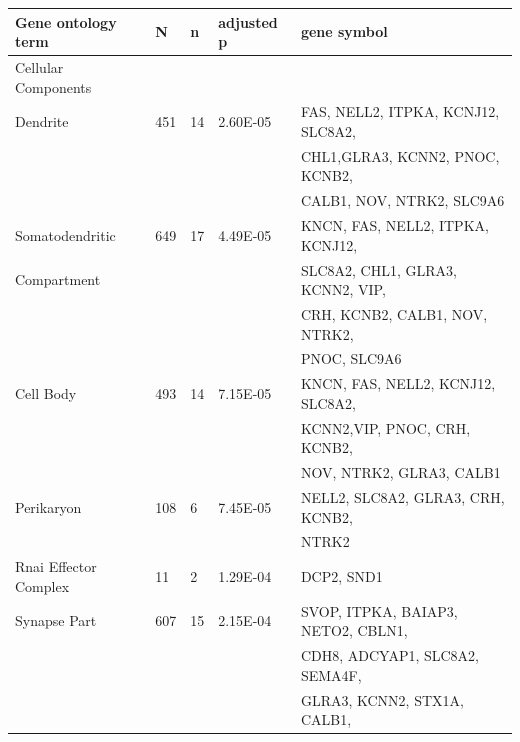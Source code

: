 \begin{refsection}
\begin{table}[H]
\small
{}\selectfont
{} \label{table3S4} 
\centering
\begin{tabular}{@{}lllll@{}}
\hline
Gene ontology term         & N   & n  & adjusted p & gene symbol                        \\ \hline
Cellular Components        &     &    &            &                                    \\
Dendrite                   & 451 & 14 & 2.60E-05   & FAS, NELL2, ITPKA, KCNJ12, SLC8A2, \\
                           &     &    &            & CHL1,GLRA3, KCNN2, PNOC, KCNB2,    \\
                           &     &    &            & CALB1, NOV, NTRK2, SLC9A6          \\
Somatodendritic            & 649 & 17 & 4.49E-05   & KNCN, FAS, NELL2, ITPKA, KCNJ12,   \\
Compartment                &     &    &            & SLC8A2, CHL1, GLRA3, KCNN2, VIP,   \\
                           &     &    &            & CRH, KCNB2, CALB1, NOV, NTRK2,     \\
                           &     &    &            & PNOC, SLC9A6                       \\
Cell Body                  & 493 & 14 & 7.15E-05   & KNCN, FAS, NELL2, KCNJ12, SLC8A2,  \\
                           &     &    &            & KCNN2,VIP, PNOC, CRH, KCNB2,       \\
                           &     &    &            & NOV, NTRK2, GLRA3, CALB1           \\
Perikaryon                 & 108 & 6  & 7.45E-05   & NELL2, SLC8A2, GLRA3, CRH, KCNB2,  \\
                           &     &    &            & NTRK2                              \\
Rnai Effector Complex      & 11  & 2  & 1.29E-04   & DCP2, SND1                         \\
Synapse Part               & 607 & 15 & 2.15E-04   & SVOP, ITPKA, BAIAP3, NETO2, CBLN1, \\
                           &     &    &            & CDH8, ADCYAP1, SLC8A2, SEMA4F,     \\
                           &     &    &            & GLRA3, KCNN2, STX1A, CALB1,        \\

\end{tabular}
\end{table}
\end{refsection}
